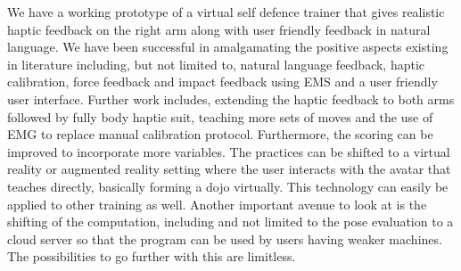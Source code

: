 We have a working prototype of a virtual self defence trainer that gives realistic haptic feedback on the right arm along with user friendly feedback in natural language. We have been successful in amalgamating the positive aspects existing in literature including, but not limited to, natural language feedback, haptic calibration, force feedback and impact feedback using EMS and a user friendly user interface. 
Further work includes, extending the haptic feedback to both arms followed by fully body haptic suit, teaching more sets of moves and the use of EMG to replace manual calibration protocol. Furthermore, the scoring can be improved to incorporate more variables. The practices can be shifted to a virtual reality or augmented reality setting where the user interacts with the avatar that teaches directly, basically forming a dojo virtually. This technology can easily be applied to other training as well. Another important avenue to look at is the shifting of the computation, including and not limited to the pose evaluation to a cloud server so that the program can be used by users having weaker machines. The possibilities to go further with this are limitless.
